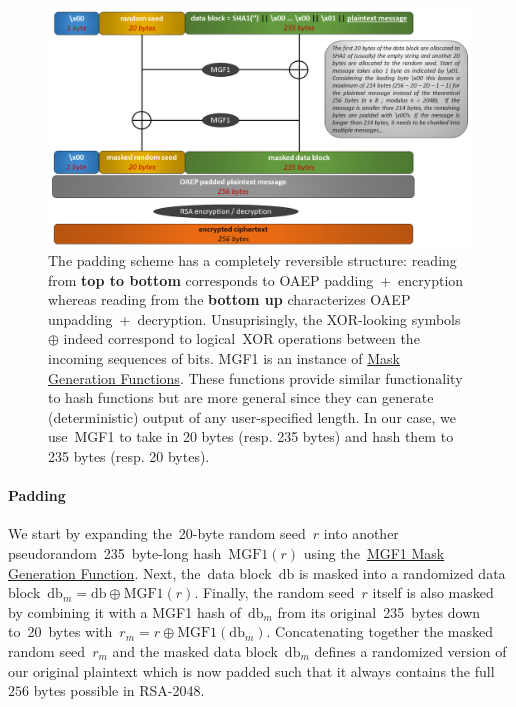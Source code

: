 \documentclass{article}
\begin{document}
\begin{figure}[t]
\centering
\includegraphics[scale=0.46]{oaep.png}
\caption{The padding scheme has a completely reversible structure: reading from {\bf top to bottom} corresponds to OAEP padding~+~encryption whereas reading from the {\bf bottom up} characterizes OAEP unpadding~+~decryption.  Unsuprisingly, the XOR-looking symbols~$\oplus$ indeed correspond to logical~XOR operations between the incoming sequences of bits. MGF1 is an instance of \href{https://en.wikipedia.org/wiki/Mask_generation_function}{Mask Generation Functions}.  These functions provide similar functionality to hash functions but are more general since they can generate (deterministic) output of any user-specified length. In our case, we use~MGF1 to take in 20 bytes (resp. 235 bytes) and hash them to 235 bytes (resp. 20 bytes).}
\label{fig:oaep}
\end{figure}

\paragraph{Padding} We start by expanding the~20-byte random seed~$r$ into another pseudorandom~235~byte-long hash~$\text{MGF1}(r)$ using the~\href{https://en.wikipedia.org/wiki/Mask_generation_function}{MGF1 Mask Generation Function}.  Next, the~data block~$\text{db}$ is masked into a randomized data block~$\text{db}_m = \text{db} \oplus \text{MGF1}(r)$.  Finally, the random seed~$r$ itself is also masked by combining it with a MGF1 hash of~$\text{db}_m$ from its original~235~bytes down to~20~bytes with~$r_m = r \oplus \text{MGF1}(\text{db}_m)$.  Concatenating together the masked random seed~$r_m$ and the masked data block~$\text{db}_m$ defines a randomized version of our original plaintext which is now padded such that it always contains the full~$256$ bytes possible in RSA-2048.
\end{document}
